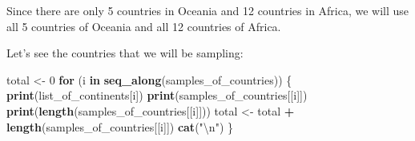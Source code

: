 \documentclass[]{article}
\newenvironment{Shaded}{\begin{snugshade}}{\end{snugshade}}
\newcommand{\CharTok}[1]{\textcolor[rgb]{0.31,0.60,0.02}{#1}}
\newcommand{\ControlFlowTok}[1]{\textcolor[rgb]{0.13,0.29,0.53}{\textbf{#1}}}
\newcommand{\DecValTok}[1]{\textcolor[rgb]{0.00,0.00,0.81}{#1}}
\newcommand{\KeywordTok}[1]{\textcolor[rgb]{0.13,0.29,0.53}{\textbf{#1}}}
\newcommand{\NormalTok}[1]{#1}
\newcommand{\OperatorTok}[1]{\textcolor[rgb]{0.81,0.36,0.00}{\textbf{#1}}}
\newcommand{\StringTok}[1]{\textcolor[rgb]{0.31,0.60,0.02}{#1}}
\begin{document}
Since there are only 5 countries in Oceania and 12 countries in Africa,
we will use all 5 countries of Oceania and all 12 countries of Africa.

\begin{Shaded}
\end{Shaded}

Let's see the countries that we will be sampling:

\begin{Shaded}
\begin{Highlighting}[]
\NormalTok{total <-}\StringTok{ }\DecValTok{0}
\ControlFlowTok{for}\NormalTok{ (i }\ControlFlowTok{in} \KeywordTok{seq_along}\NormalTok{(samples_of_countries))}
\NormalTok{\{}
    \KeywordTok{print}\NormalTok{(list_of_continents[i])}
    \KeywordTok{print}\NormalTok{(samples_of_countries[[i]])}
    \KeywordTok{print}\NormalTok{(}\KeywordTok{length}\NormalTok{(samples_of_countries[[i]]))}
\NormalTok{    total <-}\StringTok{ }\NormalTok{total }\OperatorTok{+}\StringTok{ }\KeywordTok{length}\NormalTok{(samples_of_countries[[i]])}
    \KeywordTok{cat}\NormalTok{(}\StringTok{"}\CharTok{\textbackslash{}n}\StringTok{"}\NormalTok{)}
\NormalTok{\}}
\end{Highlighting}
\end{Shaded}
\end{document}
